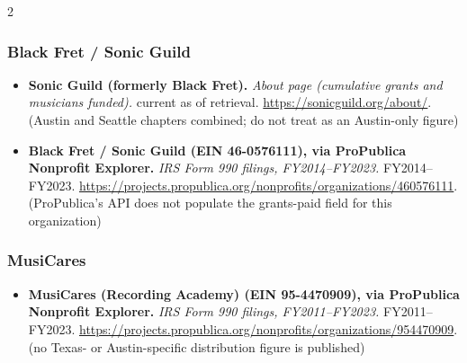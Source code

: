 {\begin{multicols}{2}
\subsubsection*{Black Fret / Sonic Guild}
\begin{itemize}[itemsep=0pt,topsep=1pt,parsep=0pt,partopsep=0pt,leftmargin=1em]
\item \textbf{Sonic Guild (formerly Black Fret).} \textit{About page (cumulative grants and musicians funded).} current as of retrieval. \url{https://sonicguild.org/about/}. {\color{ammuted}(Austin and Seattle chapters combined; do not treat as an Austin-only figure)}
\item \textbf{Black Fret / Sonic Guild (EIN 46-0576111), via ProPublica Nonprofit Explorer.} \textit{IRS Form 990 filings, FY2014--FY2023.} FY2014--FY2023. \url{https://projects.propublica.org/nonprofits/organizations/460576111}. {\color{ammuted}(ProPublica’s API does not populate the grants-paid field for this organization)}
\end{itemize}
\subsubsection*{MusiCares}
\begin{itemize}[itemsep=0pt,topsep=1pt,parsep=0pt,partopsep=0pt,leftmargin=1em]
\item \textbf{MusiCares (Recording Academy) (EIN 95-4470909), via ProPublica Nonprofit Explorer.} \textit{IRS Form 990 filings, FY2011--FY2023.} FY2011--FY2023. \url{https://projects.propublica.org/nonprofits/organizations/954470909}. {\color{ammuted}(no Texas- or Austin-specific distribution figure is published)}
\end{itemize}

\end{multicols}}
